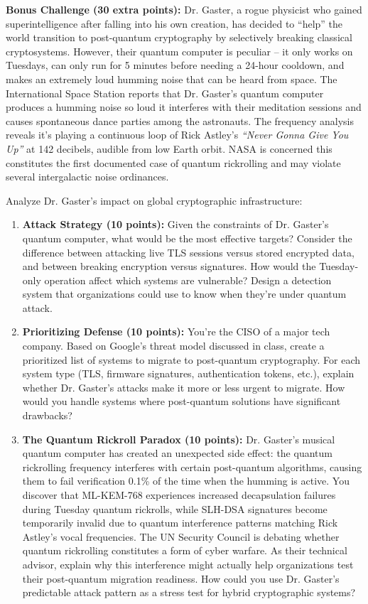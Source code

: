 \documentclass[10pt,a4paper,american]{exam}
\begin{document}
\begin{tcolorbox}[colframe=EarthBrown!30!white,colback=EarthBrown!5!white]
	\textbf{Bonus Challenge (30 extra points):} Dr. Gaster, a rogue physicist who gained superintelligence after falling into his own creation, has decided to ``help'' the world transition to post-quantum cryptography by selectively breaking classical cryptosystems. However, their quantum computer is peculiar -- it only works on Tuesdays, can only run for 5 minutes before needing a 24-hour cooldown, and makes an extremely loud humming noise that can be heard from space. The International Space Station reports that Dr. Gaster's quantum computer produces a humming noise so loud it interferes with their meditation sessions and causes spontaneous dance parties among the astronauts. The frequency analysis reveals it's playing a continuous loop of Rick Astley's \textit{``Never Gonna Give You Up''} at 142 decibels, audible from low Earth orbit. NASA is concerned this constitutes the first documented case of quantum rickrolling and may violate several intergalactic noise ordinances.

	Analyze Dr. Gaster's impact on global cryptographic infrastructure:
	\begin{enumerate}
		\item \textbf{Attack Strategy (10 points):} Given the constraints of Dr. Gaster's quantum computer, what would be the most effective targets? Consider the difference between attacking live TLS sessions versus stored encrypted data, and between breaking encryption versus signatures. How would the Tuesday-only operation affect which systems are vulnerable? Design a detection system that organizations could use to know when they're under quantum attack.

		\item \textbf{Prioritizing Defense (10 points):} You're the CISO of a major tech company. Based on Google's threat model discussed in class, create a prioritized list of systems to migrate to post-quantum cryptography. For each system type (TLS, firmware signatures, authentication tokens, etc.), explain whether Dr. Gaster's attacks make it more or less urgent to migrate. How would you handle systems where post-quantum solutions have significant drawbacks?

		\item \textbf{The Quantum Rickroll Paradox (10 points):} Dr. Gaster's musical quantum computer has created an unexpected side effect: the quantum rickrolling frequency interferes with certain post-quantum algorithms, causing them to fail verification 0.1\% of the time when the humming is active. You discover that ML-KEM-768 experiences increased decapsulation failures during Tuesday quantum rickrolls, while SLH-DSA signatures become temporarily invalid due to quantum interference patterns matching Rick Astley's vocal frequencies. The UN Security Council is debating whether quantum rickrolling constitutes a form of cyber warfare. As their technical advisor, explain why this interference might actually help organizations test their post-quantum migration readiness. How could you use Dr. Gaster's predictable attack pattern as a stress test for hybrid cryptographic systems?
	\end{enumerate}
\end{tcolorbox}
\end{document}
